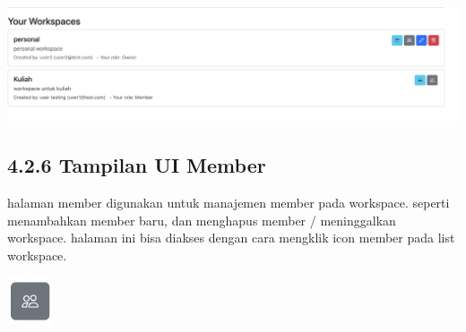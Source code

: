 \begin{center}
  \includegraphics[width=1\textwidth]{assets/ui/workspace_list_row.png}
\end{center}

\subsection*{4.2.6 Tampilan UI Member}
halaman member digunakan untuk manajemen member pada workspace.
seperti menambahkan member baru, dan menghapus member / meninggalkan workspace.
halaman ini bisa diakses dengan cara mengklik icon member pada list workspace.
\begin{center}
  \includegraphics[width=0.1\textwidth]{assets/ui/workspace_member_icon.png}
\end{center}

